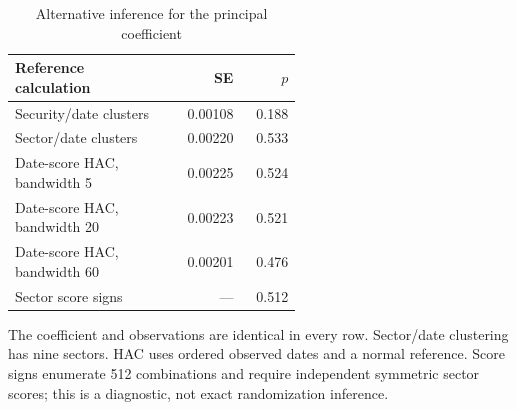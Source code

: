 \begin{table}[htbp]
\centering
\caption{Alternative inference for the principal coefficient}
\label{tab:inference}
\begin{minipage}{\linewidth}
\small
\setlength{\tabcolsep}{4pt}
\begingroup\centering
\begin{tabular}{p{0.57\linewidth}rr}
\toprule
Reference calculation & SE & $p$ \\
\midrule
Security/date clusters & 0.00108 & 0.188 \\
Sector/date clusters & 0.00220 & 0.533 \\
Date-score HAC, bandwidth 5 & 0.00225 & 0.524 \\
Date-score HAC, bandwidth 20 & 0.00223 & 0.521 \\
Date-score HAC, bandwidth 60 & 0.00201 & 0.476 \\
Sector score signs & --- & 0.512 \\
\bottomrule
\end{tabular}\par\endgroup
\par\vspace{0.5em}\footnotesize The coefficient and observations are identical in every row. Sector/date clustering has nine sectors. HAC uses ordered observed dates and a normal reference. Score signs enumerate 512 combinations and require independent symmetric sector scores; this is a diagnostic, not exact randomization inference.
\end{minipage}
\end{table}

